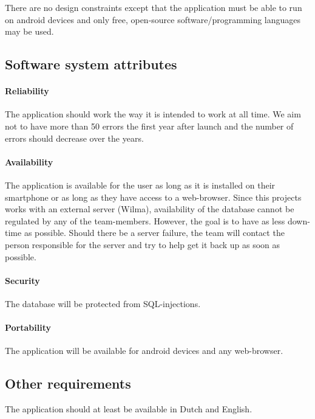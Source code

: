 \documentclass[9pt]{article}
\begin{document}
There are no design constraints except that the application must be able
to run on android devices and only free, open-source
software/programming languages may be used.

\subsection{Software system
attributes}\label{software-system-attributes}

\paragraph{Reliability}\label{reliability}

The application should work the way it is intended to work at all time.
We aim not to have more than 50 errors the first year after launch and
the number of errors should decrease over the years.

\paragraph{Availability}\label{availability}

The application is available for the user as long as it is installed on
their smartphone or as long as they have access to a web-browser. Since
this projects works with an external server (Wilma), availability of the
database cannot be regulated by any of the team-members. However, the
goal is to have as less down-time as possible. Should there be a server
failure, the team will contact the person responsible for the server and
try to help get it back up as soon as possible.

\paragraph{Security}\label{security}

The database will be protected from SQL-injections.

\paragraph{Portability}\label{portability}

The application will be available for android devices and any
web-browser.

\subsection{Other requirements}\label{other-requirements}

The application should at least be available in Dutch and English.
\end{document}
